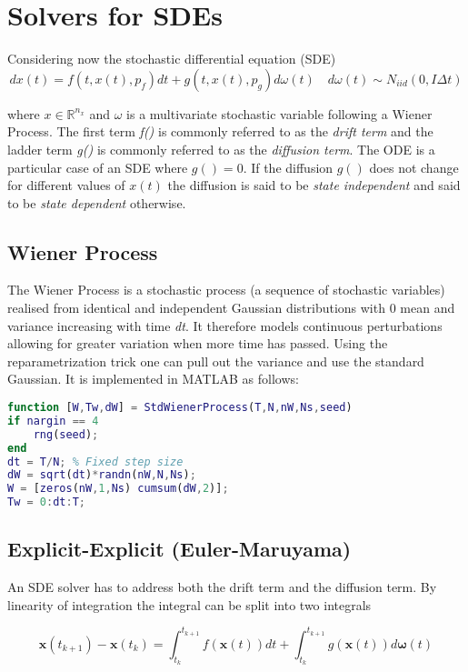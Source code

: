 \section{Solvers for SDEs}
Considering now the stochastic differential equation (SDE)
$$
d x(t)=f\left(t, x(t), p_{f}\right) d t+g\left(t, x(t), p_{g}\right) d \omega(t) \quad d \omega(t) \sim N_{i i d}(0, I \Delta t)
$$

where $x \in \mathbb{R}^{n_{x}}$ and $\omega$ is a multivariate stochastic variable following a Wiener Process. The first term \textit{f()} is commonly referred to as the \textit{drift term} and the ladder term \textit{g()} is commonly referred to as the \textit{diffusion term}. The ODE is a particular case of an SDE where $g() = 0$. If the diffusion $g()$ does not change for different values of $x(t)$ the diffusion is said to be \textit{state independent} and said to be \textit{state dependent} otherwise.

\subsection{Wiener Process}
The Wiener Process is a stochastic process (a sequence of stochastic variables) realised from identical and independent Gaussian distributions with 0 mean and variance increasing with time \textit{dt}. It therefore models continuous perturbations allowing for greater variation when more time has passed. Using the reparametrization trick one can pull out the variance and use the standard Gaussian. It is implemented in MATLAB as follows:

\begin{adjustwidth*}{0cm}{-0.4cm}
\begin{lstlisting}[frame=single, language=Matlab,caption=Wiener Process, label=LittleWiener]
function [W,Tw,dW] = StdWienerProcess(T,N,nW,Ns,seed)
if nargin == 4
    rng(seed);
end
dt = T/N; % Fixed step size
dW = sqrt(dt)*randn(nW,N,Ns);
W = [zeros(nW,1,Ns) cumsum(dW,2)];
Tw = 0:dt:T;
\end{lstlisting}
\end{adjustwidth*}

\subsection{Explicit-Explicit (Euler-Maruyama)}
An SDE solver has to address both the drift term and the diffusion term. By linearity of integration the integral can be split into two integrals

\begin{equation}
\boldsymbol{x}\left(t_{k+1}\right)-\boldsymbol{x}\left(t_{k}\right)=\int_{t_{k}}^{t_{k+1}} f(\boldsymbol{x}(t)) d t+\int_{t_{k}}^{t_{k+1}} g(\boldsymbol{x}(t)) d \boldsymbol{\omega}(t)
\end{equation}

